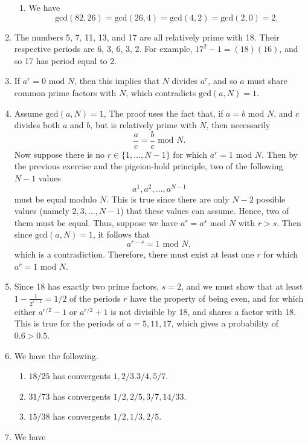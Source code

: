 \documentclass [12pt]{article}
\theoremstyle{definition}
\begin{document}
\begin{enumerate}
\begin{enumerate}
\item We have
\[\mbox{gcd}(82,26) = \mbox{gcd}(26,4) = \mbox{gcd}(4,2) = \mbox{gcd}(2,0) = 2.\]
\end{enumerate}

\item The numbers 5, 7, 11, 13, and 17 are all relatively prime with 18. Their respective periods are 6, 3, 6, 3, 2.
For example, $17^2-1 = (18)(16)$, and so 17 has period equal to 2.


\item If $a^r=0\mbox{ mod } N$, then this implies that $N$ divides $a^r$, and so $a$ must share common prime factors with $N$, which contradicts
$\mbox{gcd}(a,N)=1$.

\item Assume $\mbox{gcd}(a,N)=1$,
The proof uses the fact that, if $a=b\mbox{ mod } N$, and $c$ divides both $a$ and $b$, but is relatively prime with $N$, then necessarily
\[\frac{a}{c}=\frac{b}{c}\mbox{ mod } N.\]
Now suppose there is no  $r\in\{1,\ldots,N-1\}$ for which $a^r=1\mbox{ mod }N$. 
Then by the previous exercise and the pigeion-hold principle, two of the following $N-1$ values 
\[a^1, a^2,\ldots,a^{N-1}\]
must be equal modulo $N$.
This is true since there are only $N-2$ possible values (namely $2,3,\ldots,N-1$)  that these values can assume. Hence, two of them must be equal.
Thus, suppose we have $a^r=a^s\mbox{ mod } N$ with $r > s$. Then since $\mbox{gcd}(a,N)=1$,
it follows that
\[a^{r-s}=1\mbox{ mod } N,\]
which is a contradiction. Therefore, there must exist at least one $r$ for which $a^r=1\mbox{ mod }N$.


\item Since 18 has exactly two prime factors, $s=2$, and we must show that at least $1-\frac{1}{2^{s-1}}=1/2$ of the periods $r$ have the property of being even,
and for which either $a^{r/2}-1$ or $a^{r/2}+1$ is not divisible by 18, and shares a factor with 18. This is true for the periods
of $a=5,11,17$, which gives a probability of $0.6 > 0.5$.


\item We have the following.
\begin{enumerate}
\item $18/25$ has convergents $1,2/3.3/4,5/7$.
\item $31/73$ has convergents $1/2,2/5,3/7,14/33$.
\item $15/38$ has convergents $1/2,1/3,2/5$.
\end{enumerate}

\item We have


\end{enumerate}
\end{document}
